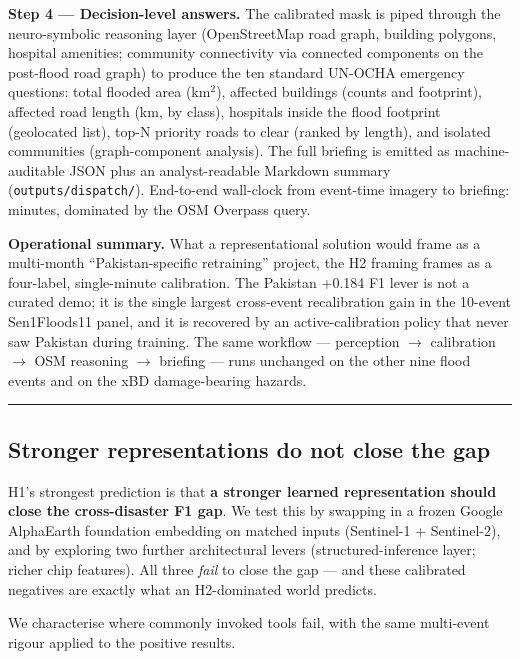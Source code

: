 \documentclass[sn-nature,lineno]{sn-jnl}
\theoremstyle{thmstyleone}
\theoremstyle{thmstyletwo}
\theoremstyle{thmstylethree}
\begin{document}
\textbf{Step 4 --- Decision-level answers.} The calibrated mask is piped
through the neuro-symbolic reasoning layer (OpenStreetMap road graph,
building polygons, hospital amenities; community connectivity via
connected components on the post-flood road graph) to produce the ten
standard UN-OCHA emergency questions: total flooded area
(km$^{2}$), affected buildings (counts and footprint), affected road length
(km, by class), hospitals inside the flood footprint (geolocated list),
top-N priority roads to clear (ranked by length), and isolated
communities (graph-component analysis). The full briefing is emitted
as machine-auditable JSON plus an analyst-readable Markdown summary
(\texttt{outputs/dispatch/}). End-to-end wall-clock from event-time imagery
to briefing: minutes, dominated by the OSM Overpass query.

\textbf{Operational summary.} What a representational solution would frame
as a multi-month ``Pakistan-specific retraining'' project, the H2 framing
frames as a four-label, single-minute calibration. The Pakistan +0.184
F1 lever is not a curated demo; it is the single largest cross-event
recalibration gain in the 10-event Sen1Floods11 panel, and it is
recovered by an active-calibration policy that never saw Pakistan
during training. The same workflow --- perception $\rightarrow$ calibration $\rightarrow$ OSM
reasoning $\rightarrow$ briefing --- runs unchanged on the other nine flood events
and on the xBD damage-bearing hazards.

\begin{center}\rule{0.5\linewidth}{0.5pt}\end{center}

\subsection{Stronger representations do not close the gap}\label{stronger-representations-do-not-close-the-gap}

H1's strongest prediction is that \textbf{a stronger learned representation
should close the cross-disaster F1 gap}. We test this by swapping in a
frozen Google AlphaEarth foundation embedding on matched inputs
(Sentinel-1 + Sentinel-2), and by exploring two further architectural
levers (structured-inference layer; richer chip features). All three
\emph{fail} to close the gap --- and these calibrated negatives are exactly
what an H2-dominated world predicts.

We characterise where commonly invoked tools fail, with the same multi-event
rigour applied to the positive results.
\end{document}
